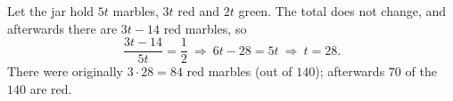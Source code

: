 Let the jar hold $5t$ marbles, $3t$ red and $2t$ green. The total does not change, and afterwards there are $3t-14$ red marbles, so
\[
\dfrac{3t-14}{5t}=\dfrac{1}{2}\ \Longrightarrow\ 6t-28=5t\ \Longrightarrow\ t=28 .
\]
There were originally $3\cdot28=\boxed{84}$ red marbles (out of $140$); afterwards $70$ of the $140$ are red.
